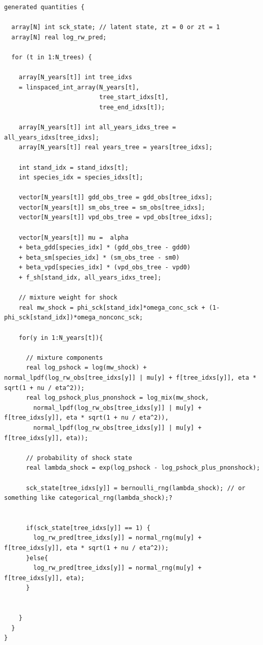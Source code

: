 \documentclass[
  letterpaper,
  DIV=11,
  numbers=noendperiod]{scrartcl}
\begin{document}
\begin{verbatim}
generated quantities {

  array[N] int sck_state; // latent state, zt = 0 or zt = 1
  array[N] real log_rw_pred;

  for (t in 1:N_trees) {
    
    array[N_years[t]] int tree_idxs
    = linspaced_int_array(N_years[t],
                          tree_start_idxs[t],
                          tree_end_idxs[t]);

    array[N_years[t]] int all_years_idxs_tree = all_years_idxs[tree_idxs];
    array[N_years[t]] real years_tree = years[tree_idxs];

    int stand_idx = stand_idxs[t];
    int species_idx = species_idxs[t];

    vector[N_years[t]] gdd_obs_tree = gdd_obs[tree_idxs];
    vector[N_years[t]] sm_obs_tree = sm_obs[tree_idxs];
    vector[N_years[t]] vpd_obs_tree = vpd_obs[tree_idxs];

    vector[N_years[t]] mu =  alpha
    + beta_gdd[species_idx] * (gdd_obs_tree - gdd0)
    + beta_sm[species_idx] * (sm_obs_tree - sm0)
    + beta_vpd[species_idx] * (vpd_obs_tree - vpd0)
    + f_sh[stand_idx, all_years_idxs_tree];
    
    // mixture weight for shock
    real mw_shock = phi_sck[stand_idx]*omega_conc_sck + (1-phi_sck[stand_idx])*omega_nonconc_sck;
    
    for(y in 1:N_years[t]){
      
      // mixture components
      real log_pshock = log(mw_shock) + normal_lpdf(log_rw_obs[tree_idxs[y]] | mu[y] + f[tree_idxs[y]], eta * sqrt(1 + nu / eta^2));
      real log_pshock_plus_pnonshock = log_mix(mw_shock, 
        normal_lpdf(log_rw_obs[tree_idxs[y]] | mu[y] + f[tree_idxs[y]], eta * sqrt(1 + nu / eta^2)),
        normal_lpdf(log_rw_obs[tree_idxs[y]] | mu[y] + f[tree_idxs[y]], eta));
      
      // probability of shock state
      real lambda_shock = exp(log_pshock - log_pshock_plus_pnonshock);
      
      sck_state[tree_idxs[y]] = bernoulli_rng(lambda_shock); // or something like categorical_rng(lambda_shock);?

      
      if(sck_state[tree_idxs[y]] == 1) {
        log_rw_pred[tree_idxs[y]] = normal_rng(mu[y] + f[tree_idxs[y]], eta * sqrt(1 + nu / eta^2));
      }else{
        log_rw_pred[tree_idxs[y]] = normal_rng(mu[y] + f[tree_idxs[y]], eta);
      }

      
    }
  }
}
\end{verbatim}
\end{document}
